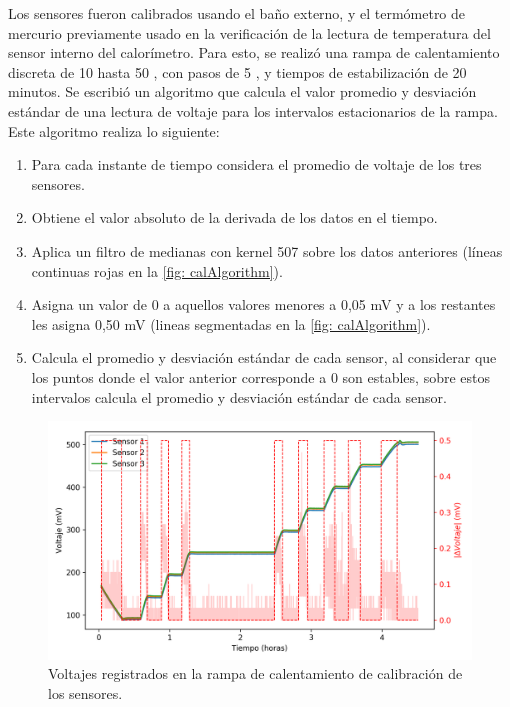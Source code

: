 	Los sensores fueron calibrados usando el baño externo, y el termómetro de mercurio previamente usado en la verificación de la lectura de temperatura del sensor interno del calorímetro. Para esto, se realizó una rampa de calentamiento discreta de 10 \grad{} hasta 50 \grad{}, con pasos de 5 \grad{}, y tiempos de estabilización de 20 minutos. Se escribió un algoritmo que calcula el valor promedio y desviación estándar de una lectura de voltaje para los intervalos estacionarios de la rampa. Este algoritmo realiza lo siguiente:
	\begin{enumerate}
		\item Para cada instante de tiempo considera el promedio de voltaje de los tres sensores.
		\item Obtiene el valor absoluto de la derivada de los datos en el tiempo.
		\item Aplica un filtro de medianas con kernel 507 sobre los datos anteriores (líneas continuas rojas en la \autoref{fig: calAlgorithm}).
		\item Asigna un valor de 0 a aquellos valores menores a 0,05 mV y a los restantes les asigna 0,50 mV (lineas segmentadas en la \autoref{fig: calAlgorithm}).
		\item Calcula el promedio y desviaci\'on est\'andar de cada sensor, al considerar que los puntos donde el valor anterior corresponde a 0 son estables, sobre estos intervalos calcula el promedio y desviación estándar de cada sensor.
	\end{enumerate}
	
	\begin{figure}[h]
		\centering
		\includegraphics[width=\linewidth]{../Data/TemperatureCalibration/dV-t}
		\caption{Voltajes registrados en la rampa de calentamiento de calibración de los sensores.}
		\label{fig: calAlgorithm}
	\end{figure}

